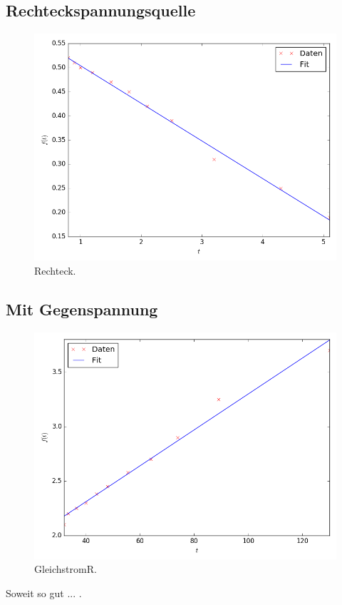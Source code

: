 \subsection{Rechteckspannungsquelle}

\begin{figure}
	\centering
	\includegraphics[width=\linewidth,height=\textheight,keepaspectratio]{Rechteck.png}
	\caption{Rechteck.}
	\label{fig:Rechteck}
\end{figure}



\subsection{ Mit Gegenspannung}
\begin{figure}
	\centering
	\includegraphics[width=\linewidth,height=\textheight,keepaspectratio]{GleichstromR.png}
	\caption{GleichstromR.}
	\label{fig:GleichstromR}
\end{figure}


Soweit so gut ... .
